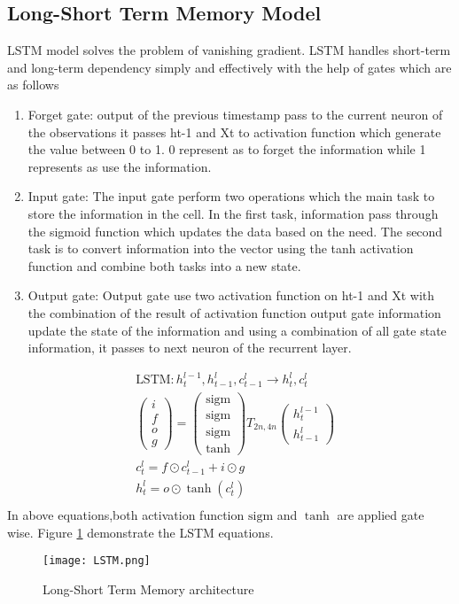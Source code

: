 \newpage{} 
\subsection{Long-Short Term Memory Model}
LSTM model solves the problem of vanishing gradient. LSTM handles short-term and long-term dependency simply and effectively with the help of gates which are as follows 
\begin{enumerate}
\item Forget gate: output of the previous timestamp pass to the current neuron of the observations it passes ht-1 and Xt to activation function which generate the value between 0 to 1. 0 represent as to forget the information while 1 represents as use the information.
\item Input gate: The input gate perform two operations which the main task to store the information in the cell. In the first task, information pass through the sigmoid function which updates the data based on the need. The second task is to convert information into the vector using the tanh activation function and combine both tasks into a new state.
\item Output gate: Output gate use two activation function on ht-1 and Xt with the combination of the result of activation function output gate information update the state of the information and using a combination of all gate state information, it passes to next neuron of the recurrent layer.
\end{enumerate} 
\begin{align*}
&\text{LSTM} : h^{l-1}_t, h^l_{t-1}, c^l_{t - 1} \rightarrow h^l_t, c^l_t\\
&\begin{pmatrix}i\\f\\o\\g\end{pmatrix} =
  \begin{pmatrix}\mathrm{sigm}\\\mathrm{sigm}\\\mathrm{sigm}\\\tanh\end{pmatrix}
  T_{2n,4n}\begin{pmatrix}h^{l - 1}_t\\h^l_{t-1}\end{pmatrix}\\
&c^l_t = f \odot c^l_{t-1} + i \odot g\\
&h^l_t = o \odot \tanh(c^l_t)\\
\end{align*}
In above equations,both activation function $\mathrm{sigm}$ and $\tanh$ are applied
gate wise. Figure \ref{fig:lstm} demonstrate the LSTM
equations.
\begin{figure}
  
      \texttt{[image: LSTM.png]}
  \caption{Long-Short Term Memory architecture}
  \label{fig:lstm}
\end{figure}

